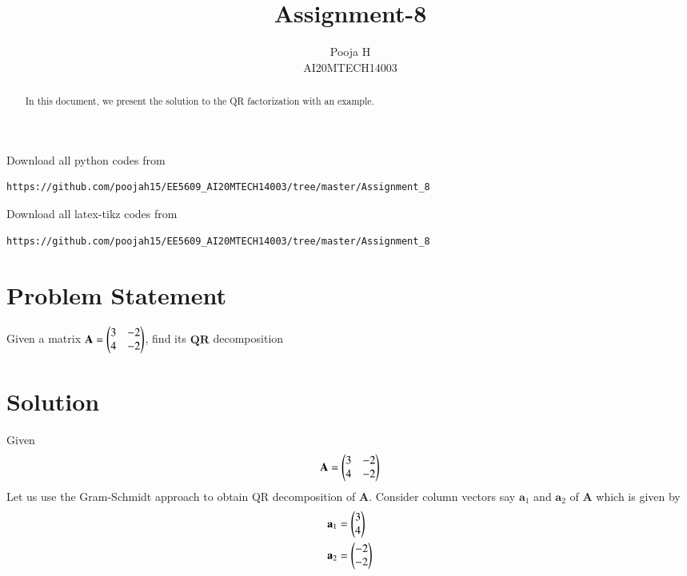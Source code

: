 \documentclass[journal,12pt,twocolumn]{IEEEtran}
\begin{document}
\let\vec\mathbf
\renewcommand{\thefigure}{\theproblem}
\def\putbox#1#2#3{\makebox[0in][l]{\makebox[#1][l]{}\raisebox{\baselineskip}[0in][0in]{\raisebox{#2}[0in][0in]{#3}}}}
     \def\rightbox#1{\makebox[0in][r]{#1}}
     \def\centbox#1{\makebox[0in]{#1}}
     \def\topbox#1{\raisebox{-\baselineskip}[0in][0in]{#1}}
     \def\midbox#1{\raisebox{-0.5\baselineskip}[0in][0in]{#1}}
\vspace{3cm}
\title{Assignment-8}
\author{Pooja H \\ AI20MTECH14003}
\maketitle
\newpage
\bigskip
\renewcommand{\thefigure}{\theenumi}
\renewcommand{\thetable}{\theenumi}
\begin{abstract}
In this document, we present the solution to the QR factorization with an example.
\end{abstract}
Download all python codes from 
\begin{lstlisting}
https://github.com/poojah15/EE5609_AI20MTECH14003/tree/master/Assignment_8
\end{lstlisting}
Download all latex-tikz codes from 
\begin{lstlisting}
https://github.com/poojah15/EE5609_AI20MTECH14003/tree/master/Assignment_8
\end{lstlisting}


\section{Problem Statement}
Given a matrix $\vec{A} = \myvec{3 & -2\\4 & -2}$, find its $\vec{QR}$ decomposition

\section{Solution}
Given
\begin{align}
	\vec{A} =\myvec{3& -2 \\ 4 & -2}
\end{align}
Let us use the Gram-Schmidt approach to obtain QR decomposition of $\vec{A}$. Consider column vectors say $\vec{a}_1$ and $\vec{a}_2$ of $\vec{A}$ which is given by
\begin{align}
	\vec{a}_1 &=\myvec{3 \\ 4} \\
	\vec{a}_2 &=\myvec{-2 \\ -2}
\end{align}
\end{document}
